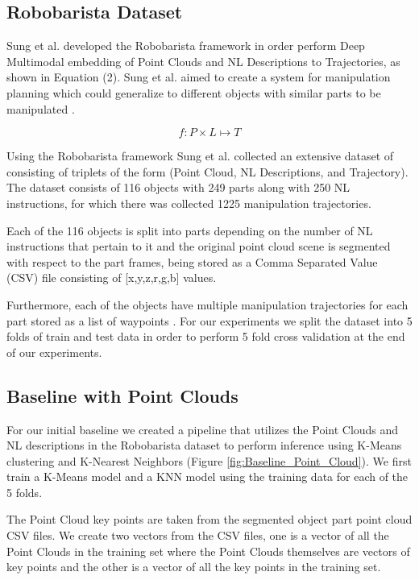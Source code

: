 \documentclass[letterpaper, 12 pt, conference]{ieeeconf}
\begin{document}
\subsection{Robobarista Dataset}

Sung et al. developed the Robobarista framework in order perform Deep Multimodal embedding of Point Clouds and NL Descriptions to Trajectories, as shown in Equation (2). Sung et al. aimed to create a system for manipulation planning which could generalize to different objects with similar parts to be manipulated \cite{sung2016robobarista}. 

\begin{equation}
f: P\times L \mapsto T
\end{equation}

Using the Robobarista framework Sung et al. collected an extensive dataset of consisting of triplets of the form (Point Cloud, NL Descriptions, and Trajectory). The dataset consists of 116 objects with 249 parts along with 250 NL instructions, for which there was collected 1225 manipulation trajectories. 

Each of the 116 objects is split into parts depending on the number of NL instructions that pertain to it and the original point cloud scene is segmented with respect to the part frames, being stored as a Comma Separated Value (CSV) file consisting of [x,y,z,r,g,b] values. 

Furthermore, each of the objects have multiple manipulation trajectories for each part stored as a list of waypoints \cite{sung2016robobarista}. For our experiments we split the dataset into 5 folds of train and test data in order to perform 5 fold cross validation at the end of our experiments.

\subsection{Baseline with Point Clouds}
For our initial baseline we created a pipeline that utilizes the Point Clouds and NL descriptions in the Robobarista dataset to perform inference using K-Means clustering and K-Nearest Neighbors (Figure \ref{fig:Baseline_Point_Cloud}). We first train a K-Means model and a KNN model using the training data for each of the 5 folds.

The Point Cloud key points are taken from the segmented object part point cloud CSV files. We create two vectors from the CSV files, one is a vector of all the Point Clouds in the training set where the Point Clouds themselves are vectors of key points and the other is a vector of all the key points in the training set. 
\end{document}
